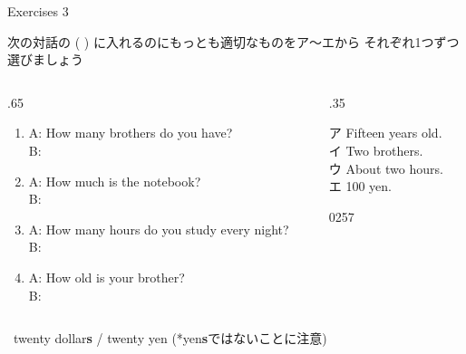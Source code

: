 \documentclass[aspectratio=169,xcolor={dvipsnames,table}]{beamer}
\begin{document}
\begin{frame}[plain]{Exercises 3}
 
 {\small 次の対話の ( ) に入れるのにもっとも適切なものをア～エから
それぞれ1つずつ選びましょう}
\begin{columns}
\begin{column}{.65\textwidth}
\begin{enumerate}
 \item A: How many brothers do you have?\\
B: 
\item A: How much is the notebook? \\
B:   
 \item  A: How many hours do you study every night?\\ 
B:   
  \item A: How old is your brother?\\
B:  
\end{enumerate} 
\end{column}
\begin{column}{.35\textwidth}
\begin{tcolorbox}
 
ア Fifteen years old.\\
イ Two brothers.\\
ウ About two hours.\\
エ 100 yen.
\end{tcolorbox}
\hfill{\tiny 0257}\,{\scriptsize {}}
\end{column}
\end{columns}


\hfill{}\textdbend\,\,\,twenty dollar\textbf{s} / twenty yen (*yen\textbf{s}ではないことに注意)
\hypertarget{today}{}
\end{frame}

\end{document}
